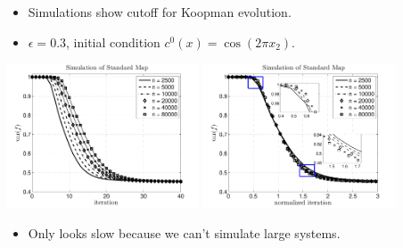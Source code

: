 \documentclass[12pt,t]{beamer}
\begin{document}
\begin{frame}
  \begin{itemize}
  \item Simulations show cutoff for Koopman evolution.
  \item $\epsilon = 0.3$, initial condition $c^0(x) = \cos(2\pi x_2)$.
  \end{itemize}
  \begin{center}
    \includegraphics[width=5.7cm]{standardmapcutoff}
    \includegraphics[width=5.7cm]{standardmapcutoffn}
  \end{center}
  \begin{itemize}
  \item Only looks slow because we can't simulate large systems.
  \end{itemize}
\end{frame}
\end{document}
